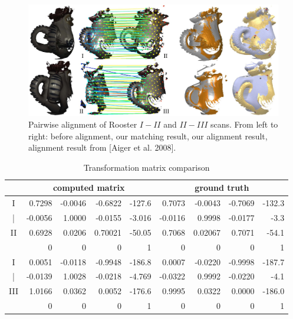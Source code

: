 \begin{figure}[t!]
\centering
  \includegraphics[width=0.99\linewidth]{figures/RoosterPair2.pdf}
  \caption{Pairwise alignment of Rooster \emph{$I-II$} and \emph{$II-III$} scans.
  From left to right: before alignment, our matching result, our alignment result, alignment result from [Aiger et al. 2008].}
\label{fig:3DPair}
\end{figure}

\begin{table}[tb]
\centering
\tabcolsep=1pt
\setlength{\aboverulesep}{0pt}
\setlength{\belowrulesep}{0pt}
\caption{Transformation matrix comparison}
\hspace{-5ex}
\label{tab:matrix}
\small
\begin{tabular}{c |rrrr |rrrr}
\toprule
 & \multicolumn{4}{|c|}{ {computed matrix}} & \multicolumn{4}{c}{ {ground truth}} \\
\hline
{I} & {0.7298} 	& {-0.0046}   & {-0.6822}	& {-127.6}  & {0.7073} 	& {-0.0043}   & {-0.7069}	& {-132.3}   \\
{|}&{-0.0056}     &  {1.0000}	& {-0.0155} & {-3.016}  & {-0.0116}	& {0.9998}	& {-0.0177}	& {-3.3}   \\
{II}&{0.6928}	    & {0.0206}	& {0.70021}	& {-50.05}  & {0.7068}     & {0.02067}   & {0.7071}	& {-54.1}   \\
&{0}             & {0}	        & {0}	        & {1}          & {0}             & {0}	        & {0}	        & {1}          \\
\hline
{I} & {0.0051} & {-0.0118} &  {-0.9948} & {-186.8}          & {0.0007} & {-0.0220} &  {-0.9998} & {-187.7}  \\
{|}  &{-0.0139} & {1.0028} &{-0.0218} & {-4.769}  	&{-0.0322} & {0.9992} &{-0.0220} & {-4.1}   \\
{III} &{1.0166} & {0.0362} &{0.0052} &{-176.6}       &{0.9995} & {0.0322} &{0.0000} &{-186.0}  \\
&        {0}             & {0}	        & {0}	        & {1}          & {0}             & {0}	        & {0}	        & {1}          \\
\bottomrule
\end{tabular}%
\end{table}%


